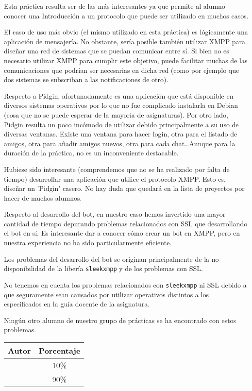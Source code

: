 Esta práctica resulta ser de las más interesantes ya que permite al alumno conocer una Introducción
a un protocolo que puede ser utilizado en muchos casos.

El caso de uso más obvio (el mismo utilizado en esta práctica) es lógicamente una aplicación de
mensajería. No obstante, sería posible también utilizar XMPP para diseñar una red de sistemas
que se puedan comunicar entre sí. Si bien no es necesario utilizar XMPP para cumplir este objetivo,
puede facilitar muchas de las comunicaciones que podrían ser necesarias en dicha red
(como por ejemplo que dos sistemas se subscriban a las notificaciones de otro).

Respecto a Pidgin, afortunadamente es una aplicación que está disponible en diversos sistemas operativos
por lo que no fue complicado instalarla en Debian (cosa que no se puede esperar de la mayoría de asignaturas).
Por otro lado, Pidgin resulta un poco incómodo de utilizar debido principalmente a su uso de diversas ventanas.
Existe una ventana para hacer login, otra para el listado de amigos, otra para añadir amigos nuevos,
otra para cada chat\dots Aunque para la duración de la práctica, no es un inconveniente destacable.

Hubiese sido interesante (comprendemos que no se ha realizado por falta de tiempo) desarrollar una
aplicación que utilice el protocolo XMPP.
Esto es, diseñar un 'Pidgin' casero.
No hay duda que quedará en la lista de proyectos por hacer de muchos alumnos.

Respecto al desarrollo del bot, en nuestro caso hemos invertido una mayor cantidad de tiempo depurando
problemas relacionados con SSL que desarrollando el bot en sí.
Es interesante dar a conocer cómo crear un bot en XMPP, pero en nuestra experiencia no ha sido particularmente
eficiente.

Los problemas del desarrollo del bot se originan principalmente de la no disponibilidad de la libería
\verb#sleekxmpp# y de los problemas con SSL.

\begin{notebox}
	No tenemos en cuenta los problemas relacionados con \verb#sleekxmpp# ni SSL debido a que seguramente
	sean causados por utilizar operativos distintos a los especificados en la guía docente de
	la asignatura.

	Ningún otro alumno de nuestro grupo de prácticas se ha encontrado con estos problemas.
\end{notebox}

\begin{center}
	\begin{tabular}{|c|c|}
		\hline
		\textbf{Autor} & \textbf{Porcentaje} \\
		\hline
		\hline
		\authorOne & 10\% \\
		\authorTwo & 90\% \\
		\hline
	\end{tabular}
\end{center}
